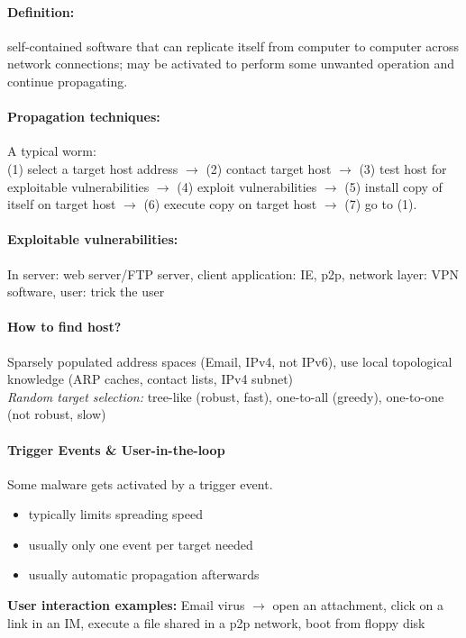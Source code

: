 \paragraph{Definition:} self-contained software that can replicate itself from computer to computer across network connections; may be activated to perform some unwanted operation and continue propagating.

\paragraph{Propagation techniques:} A typical worm:\\ (1) select a target host address $\to$ (2) contact target host $\to$ (3) test host for exploitable vulnerabilities $\to$ (4) exploit vulnerabilities $\to$ (5) install copy of itself on target host $\to$ (6) execute copy on target host $\to$ (7) go to (1).

\paragraph{Exploitable vulnerabilities:} In server: web server/FTP server, client application: IE, p2p, network layer: VPN software, user: trick the user

\paragraph{How to find host?} Sparsely populated address spaces (Email, IPv4, not IPv6), use local topological knowledge (ARP caches, contact lists, IPv4 subnet) \\
\emph{Random target selection:} tree-like (robust, fast), one-to-all (greedy), one-to-one (not robust, slow)

\paragraph{Trigger Events \& User-in-the-loop} Some malware gets activated by a trigger event. 
\begin{itemize}
\item typically limits spreading speed
\item usually only one event per target needed
\item usually automatic propagation afterwards
\end{itemize}
\textbf{User interaction examples:} Email virus $\to$ open an attachment, click on a link in an IM, execute a file shared in a p2p network, boot from floppy disk

